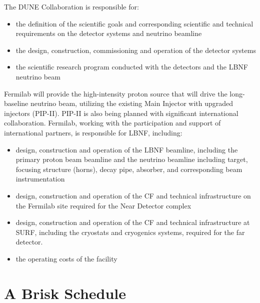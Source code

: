 The DUNE Collaboration is responsible for:
\begin{itemize}
\item the definition of the scientific goals and corresponding scientific and technical requirements on the detector systems and neutrino beamline
\item the design, construction, commissioning and operation of the detector systems 
\item the scientific research program conducted with the detectors and the LBNF neutrino beam
\end{itemize}

Fermilab will provide the high-intensity proton source that will drive the long-baseline neutrino beam, utilizing the existing Main Injector with upgraded injectors (PIP-II).  PIP-II is also being planned with significant international collaboration.  Fermilab, working %
with the participation and support of international partners, is responsible for %
LBNF, including:
\begin{itemize}
\item design, construction and operation of the LBNF beamline, including the primary proton beam beamline and the neutrino beamline including target, focusing structure (horns), decay pipe, absorber, and corresponding beam instrumentation
\item design, construction and operation of the CF and technical infrastructure on the Fermilab site required for the Near Detector complex 
\item design, construction and operation of the CF and technical infrastructure %
at SURF, including the cryostats and cryogenics systems, required for the far detector.
\item %
the operating costs of the facility
\end{itemize}


\section{A Brisk Schedule} %

